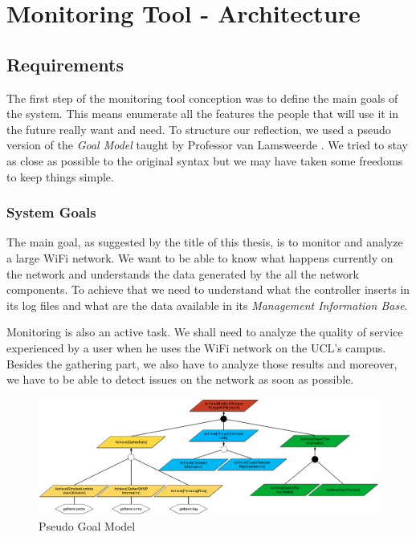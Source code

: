 
\chapter{Monitoring Tool - Architecture} %

\label{Chapter3} %

\section{Requirements}
The first step of the monitoring tool conception was to define the main goals of the system. This means enumerate all the features the people that will use it in the future really want and need. To structure our reflection, we used a pseudo version of the \emph{Goal Model} taught by Professor van Lamsweerde \cite{van2009requirements}. We tried to stay as close as possible to the original syntax but we may have taken some freedoms to keep things simple.

\subsection{System Goals}
The main goal, as suggested by the title of this thesis, is to monitor and analyze a large WiFi network. We want to be able to know what happens currently on the network and understands the data generated by the all the network components. To achieve that we need to understand what the controller inserts in its log files and what are the data available in its \emph{Management Information Base}. 

Monitoring is also an active task. We shall need to analyze the quality of service experienced by a user when he uses the WiFi network on the UCL's campus. Besides the gathering part, we also have to analyze those results and moreover, we have to be able to detect issues on the network as soon as possible.

\begin{figure}[H]
\centering
	\includegraphics[width=1.1\linewidth]{Pictures/chapter3/goals2.png}
	\caption{Pseudo Goal Model}
\end{figure}


